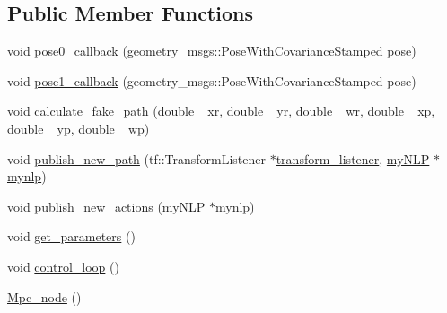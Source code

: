 \subsection*{Public Member Functions}
\begin{DoxyCompactItemize}
\item 
void \hyperlink{classMpc__node_a708cd33f3a41aac19d767879d1dc0cd7}{pose0\+\_\+callback} (geometry\+\_\+msgs\+::\+Pose\+With\+Covariance\+Stamped pose)
\item 
void \hyperlink{classMpc__node_a4f389e33d9374ed2d18f58125035a0e4}{pose1\+\_\+callback} (geometry\+\_\+msgs\+::\+Pose\+With\+Covariance\+Stamped pose)
\item 
void \hyperlink{classMpc__node_ab55c31f17c32c247adbcee5aae40c128}{calculate\+\_\+fake\+\_\+path} (double \+\_\+xr, double \+\_\+yr, double \+\_\+wr, double \+\_\+xp, double \+\_\+yp, double \+\_\+wp)
\item 
void \hyperlink{classMpc__node_a16734474d794c1896aebd9a008b96611}{publish\+\_\+new\+\_\+path} (tf\+::\+Transform\+Listener $\ast$\hyperlink{classMpc__node_acca5492f6ed78d47688621941d11d1b2}{transform\+\_\+listener}, \hyperlink{classmyNLP}{my\+N\+LP} $\ast$\hyperlink{classMpc__node_a5a7534e2aaa1e1003d4c710589e07590}{mynlp})
\item 
void \hyperlink{classMpc__node_a97467f6ef0d64235da935823cfd4bd47}{publish\+\_\+new\+\_\+actions} (\hyperlink{classmyNLP}{my\+N\+LP} $\ast$\hyperlink{classMpc__node_a5a7534e2aaa1e1003d4c710589e07590}{mynlp})
\item 
void \hyperlink{classMpc__node_ab607a3c4dfa4ebf571a60c93049e3309}{get\+\_\+parameters} ()
\item 
void \hyperlink{classMpc__node_a788f17ed756892727cf04adf1a485677}{control\+\_\+loop} ()
\item 
\hyperlink{classMpc__node_aecd75162dde3b8750c37e0b85a036097}{Mpc\+\_\+node} ()
\end{DoxyCompactItemize}
